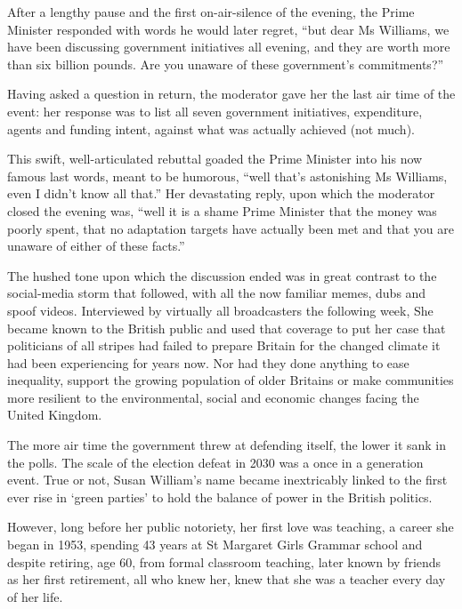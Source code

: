After a lengthy pause and the first on-air-silence of the evening, the Prime Minister responded with words he would later regret, ``but dear Ms Williams, we have been discussing government initiatives all evening, and they are worth more than six billion pounds. Are you unaware of these government's commitments?''

Having asked a question in return, the moderator gave her the last air time of the event: her response was to list all seven government initiatives, expenditure, agents and funding intent, against what was actually achieved (not much). 

This swift, well-articulated rebuttal goaded the Prime Minister into his now famous last words, meant to be humorous, ``well that's astonishing Ms Williams, even I didn't know all that.'' Her devastating reply, upon which the moderator closed the evening was, ``well it is a shame Prime Minister that the money was poorly spent, that no adaptation targets have actually been met and that you are unaware of either of these facts.''

The hushed tone upon which the discussion ended was in great contrast to the social-media storm that followed, with all the now familiar memes, dubs and spoof videos. Interviewed by virtually all broadcasters the following week, She became known to the British public and used that coverage to put her case that politicians of all stripes had failed to prepare Britain for the changed climate it had been experiencing for years now. Nor had they done anything to ease inequality, support the growing population of older Britains or make communities more resilient to the environmental, social and economic changes facing the United Kingdom.

The more air time the government threw at defending itself, the lower it sank in the polls. The scale of the election defeat in 2030 was a once in a generation event. True or not, Susan William's name became inextricably linked to the first ever rise in `green parties' to hold the balance of power in the British politics.

However, long before her public notoriety, her first love was teaching, a career she began in 1953, spending 43 years at St Margaret Girls Grammar school and despite retiring, age 60, from formal classroom teaching, later known by friends as her first retirement, all who knew her, knew that she was a teacher every day of her life.

